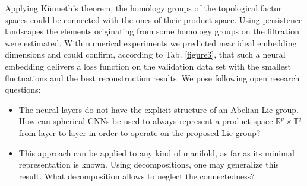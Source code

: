 \documentclass[runningheads,orivec]{llncs}
\begin{document}
Applying Künneth's theorem, the homology groups of the topological factor spaces could be connected with the ones of their product space. Using persistence landscapes the elements originating from some homology groups on the filtration were estimated. With numerical experiments we predicted near ideal embedding dimensions and could confirm, according to Tab. \ref{figure3}, that such a neural embedding delivers a loss function on the validation data set with the smallest fluctuations and the best reconstruction results. We pose following open research questions:
\begin{itemize}
    \item The neural layers do not have the explicit structure of an Abelian Lie group. How can spherical CNNs \cite{CohenGKW18} be used to always represent a product space $\mathbb{R}^p \times \mathbb{T}^q$ from layer to layer in order to operate on the proposed Lie group?
    \item This approach can be applied to any kind of manifold, as far as its minimal representation is known. Using decompositions, one may generalize this result. What decomposition allows to neglect the connectedness?
\end{itemize}



\end{document}
